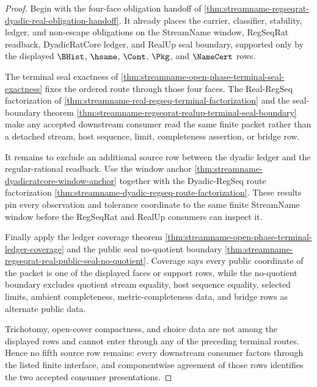 \begin{proof}
Begin with the four-face obligation handoff of \autoref{thm:streamname-regseqrat-dyadic-real-obligation-handoff}. It already places the carrier, classifier, stability, ledger, and non-escape obligations on the StreamName window, RegSeqRat readback, DyadicRatCore ledger, and RealUp seal boundary, supported only by the displayed $\BHist$, $\hsame$, $\Cont$, $\Pkg$, and $\NameCert$ rows.

The terminal seal exactness of \autoref{thm:streamname-open-phase-terminal-seal-exactness} fixes the ordered route through those four faces. The Real-RegSeq factorization of \autoref{thm:streamname-real-regseq-terminal-factorization} and the seal-boundary theorem \autoref{thm:streamname-regseqrat-realup-terminal-seal-boundary} make any accepted downstream consumer read the same finite packet rather than a detached stream, host sequence, limit, completeness assertion, or bridge row.

It remains to exclude an additional source row between the dyadic ledger and the regular-rational readback. Use the window anchor \autoref{thm:streamname-dyadicratcore-window-anchor} together with the Dyadic-RegSeq route factorization \autoref{thm:streamname-dyadic-regseq-route-factorization}. These results pin every observation and tolerance coordinate to the same finite StreamName window before the RegSeqRat and RealUp consumers can inspect it.

Finally apply the ledger coverage theorem \autoref{thm:streamname-open-phase-terminal-ledger-coverage} and the public seal no-quotient boundary \autoref{thm:streamname-regseqrat-real-public-seal-no-quotient}. Coverage says every public coordinate of the packet is one of the displayed faces or support rows, while the no-quotient boundary excludes quotient stream equality, host sequence equality, selected limits, ambient completeness, metric-completeness data, and bridge rows as alternate public data.

Trichotomy, open-cover compactness, and choice data are not among the displayed rows and cannot enter through any of the preceding terminal routes. Hence no fifth source row remains: every downstream consumer factors through the listed finite interface, and componentwise agreement of those rows identifies the two accepted consumer presentations.
\end{proof}

